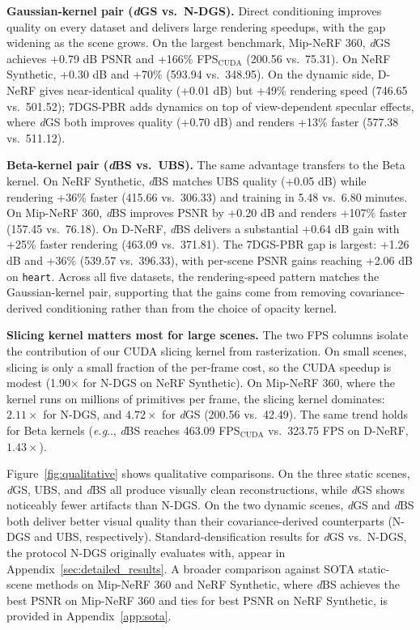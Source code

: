 \documentclass{article}
\makeatletter
\DeclareRobustCommand\onedot{\futurelet\@let@token\@onedot}
\def\@onedot{\ifx\@let@token.\else.\null\fi\xspace}
\def\eg{\emph{e.g}\onedot} \def\Eg{\emph{E.g}\onedot}
\newcommand{\dgs}{\textit{d}GS\xspace}
\newcommand{\dbs}{\textit{d}BS\xspace}
\theoremstyle{plain}
\theoremstyle{definition}
\theoremstyle{remark}
\makeatother
\begin{document}
\textbf{Gaussian-kernel pair (\dgs{} vs.\ N-DGS).} Direct conditioning improves quality on every dataset and delivers large rendering speedups, with the gap widening as the scene grows. On the largest benchmark, Mip-NeRF 360, \dgs{} achieves +0.79 dB PSNR and +166\% FPS$_{\text{CUDA}}$ (200.56 vs.\ 75.31). On NeRF Synthetic, +0.30 dB and +70\% (593.94 vs.\ 348.95). On the dynamic side, D-NeRF gives near-identical quality (+0.01 dB) but +49\% rendering speed (746.65 vs.\ 501.52); 7DGS-PBR adds dynamics on top of view-dependent specular effects, where \dgs{} both improves quality (+0.70 dB) and renders +13\% faster (577.38 vs.\ 511.12).

\textbf{Beta-kernel pair (\dbs{} vs.\ UBS).} The same advantage transfers to the Beta kernel. On NeRF Synthetic, \dbs{} matches UBS quality (+0.05 dB) while rendering +36\% faster (415.66 vs.\ 306.33) and training in 5.48 vs.\ 6.80 minutes. On Mip-NeRF 360, \dbs{} improves PSNR by +0.20 dB and renders +107\% faster (157.45 vs.\ 76.18). On D-NeRF, \dbs{} delivers a substantial +0.64 dB gain with +25\% faster rendering (463.09 vs.\ 371.81). The 7DGS-PBR gap is largest: +1.26 dB and +36\% (539.57 vs.\ 396.33), with per-scene PSNR gains reaching +2.06 dB on \texttt{heart}. Across all five datasets, the rendering-speed pattern matches the Gaussian-kernel pair, supporting that the gains come from removing covariance-derived conditioning rather than from the choice of opacity kernel.

\textbf{Slicing kernel matters most for large scenes.} The two FPS columns isolate the contribution of our CUDA slicing kernel from rasterization. On small scenes, slicing is only a small fraction of the per-frame cost, so the CUDA speedup is modest (1.90$\times$ for N-DGS on NeRF Synthetic). On Mip-NeRF 360, where the kernel runs on millions of primitives per frame, the slicing kernel dominates: $2.11\times$ for N-DGS, and $4.72\times$ for \dgs{} (200.56 vs.\ 42.49). The same trend holds for Beta kernels (\eg, \dbs{} reaches 463.09 FPS$_{\text{CUDA}}$ vs.\ 323.75 FPS on D-NeRF, $1.43\times$).

Figure~\ref{fig:qualitative} shows qualitative comparisons. On the three static scenes, \dgs{}, UBS, and \dbs{} all produce visually clean reconstructions, while \dgs{} shows noticeably fewer artifacts than N-DGS. On the two dynamic scenes, \dgs{} and \dbs{} both deliver better visual quality than their covariance-derived counterparts (N-DGS and UBS, respectively). Standard-densification results for \dgs{} vs.\ N-DGS, the protocol N-DGS originally evaluates with, appear in Appendix~\ref{sec:detailed_results}. A broader comparison against SOTA static-scene methods on Mip-NeRF 360 and NeRF Synthetic, where \dbs{} achieves the best PSNR on Mip-NeRF 360 and ties for best PSNR on NeRF Synthetic, is provided in Appendix~\ref{app:sota}.
\end{document}
